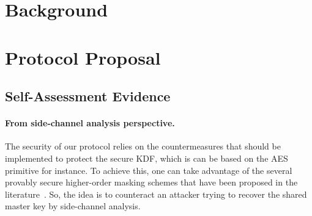 \documentclass{llncs}
\begin{document}
\section{Background}\label{sec:background}



\section{Protocol Proposal}\label{sec:protocol}



\subsection{Self-Assessment Evidence}\label{ssec:security}
\paragraph{From side-channel analysis perspective.} The security of our protocol relies on the countermeasures that should be implemented to protect the secure KDF, which is can be based on the AES primitive for instance. To achieve this, one can take advantage of the several provably secure higher-order masking schemes that have been proposed in the literature~\cite{DBLP:conf/eurocrypt/Coron14,DBLP:conf/ches/GenellePQ11,DBLP:conf/ches/RivainP10}. So, the idea is to counteract an attacker trying to recover the shared master key by side-channel analysis.
 
\end{document}
